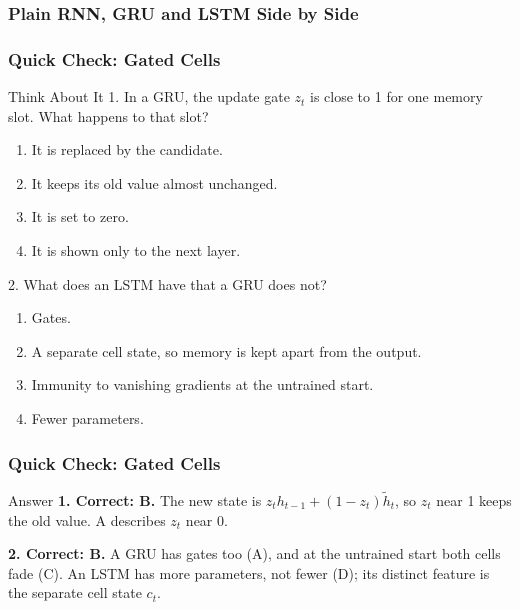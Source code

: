 \begin{frame}[fragile] \frametitle{Plain RNN, GRU and LSTM Side by Side}
\begin{center}
\small
{}
\end{center}
\end{frame}


\begin{frame}[fragile]\frametitle{Quick Check: Gated Cells}
\begin{block}{Think About It}
1. In a GRU, the update gate $z_t$ is close to 1 for one memory slot. What happens to that slot?
\begin{enumerate}
  \item[A.] It is replaced by the candidate.
  \item[B.] It keeps its old value almost unchanged.
  \item[C.] It is set to zero.
  \item[D.] It is shown only to the next layer.
\end{enumerate}
2. What does an LSTM have that a GRU does not?
\begin{enumerate}
  \item[A.] Gates.
  \item[B.] A separate cell state, so memory is kept apart from the output.
  \item[C.] Immunity to vanishing gradients at the untrained start.
  \item[D.] Fewer parameters.
\end{enumerate}
\end{block}
\end{frame}

\begin{frame}[fragile]\frametitle{Quick Check: Gated Cells}
\begin{block}{Answer}
\textbf{1. Correct: B.} The new state is $z_t h_{t-1} + (1 - z_t)\tilde{h}_t$, so $z_t$ near 1 keeps the old value. A describes $z_t$ near 0.

\textbf{2. Correct: B.} A GRU has gates too (A), and at the untrained start both cells fade (C). An LSTM has more parameters, not fewer (D); its distinct feature is the separate cell state $c_t$.
\end{block}
\end{frame}
